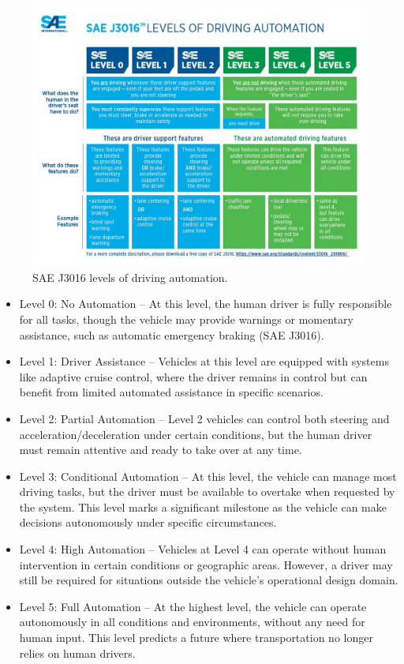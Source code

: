 \begin{figure}
    \centering
    \includegraphics[width=1\linewidth]{LateX/figs/ca3qj6bg.png}
    \caption{SAE J3016 levels of driving automation.}
    \label{fig:sae_levels_of_automation}
\end{figure}

\begin{itemize}
    \item Level 0: No Automation – At this level, the human driver is fully responsible for all tasks, though the vehicle may provide warnings or momentary assistance, such as automatic emergency braking (SAE J3016).
    \item Level 1: Driver Assistance – Vehicles at this level are equipped with systems like adaptive cruise control, where the driver remains in control but can benefit from limited automated assistance in specific scenarios.
    \item Level 2: Partial Automation – Level 2 vehicles can control both steering and acceleration/deceleration under certain conditions, but the human driver must remain attentive and ready to take over at any time.
    \item Level 3: Conditional Automation – At this level, the vehicle can manage most driving tasks, but the driver must be available to overtake when requested by the system. This level marks a significant milestone as the vehicle can make decisions autonomously under specific circumstances.
    \item Level 4: High Automation – Vehicles at Level 4 can operate without human intervention in certain conditions or geographic areas. However, a driver may still be required for situations outside the vehicle's operational design domain.
    \item Level 5: Full Automation – At the highest level, the vehicle can operate autonomously in all conditions and environments, without any need for human input. This level predicts a future where transportation no longer relies on human drivers.
\end{itemize}

